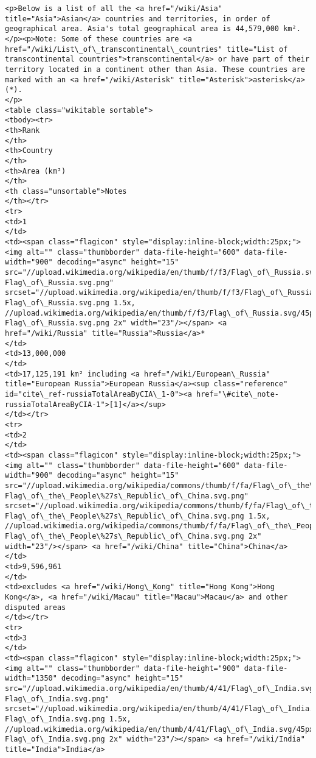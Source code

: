 \documentclass[11pt]{article}
\begin{document}
\begin{Verbatim}[commandchars=\\\{\}]
<p>Below is a list of all the <a href="/wiki/Asia" title="Asia">Asian</a> countries and territories, in order of geographical area. Asia's total geographical area is 44,579,000 km².
</p><p>Note: Some of these countries are <a href="/wiki/List\_of\_transcontinental\_countries" title="List of transcontinental countries">transcontinental</a> or have part of their territory located in a continent other than Asia. These countries are marked with an <a href="/wiki/Asterisk" title="Asterisk">asterisk</a> (*).
</p>
<table class="wikitable sortable">
<tbody><tr>
<th>Rank
</th>
<th>Country
</th>
<th>Area (km²)
</th>
<th class="unsortable">Notes
</th></tr>
<tr>
<td>1
</td>
<td><span class="flagicon" style="display:inline-block;width:25px;"><img alt="" class="thumbborder" data-file-height="600" data-file-width="900" decoding="async" height="15" src="//upload.wikimedia.org/wikipedia/en/thumb/f/f3/Flag\_of\_Russia.svg/23px-Flag\_of\_Russia.svg.png" srcset="//upload.wikimedia.org/wikipedia/en/thumb/f/f3/Flag\_of\_Russia.svg/35px-Flag\_of\_Russia.svg.png 1.5x, //upload.wikimedia.org/wikipedia/en/thumb/f/f3/Flag\_of\_Russia.svg/45px-Flag\_of\_Russia.svg.png 2x" width="23"/></span> <a href="/wiki/Russia" title="Russia">Russia</a>*
</td>
<td>13,000,000
</td>
<td>17,125,191 km² including <a href="/wiki/European\_Russia" title="European Russia">European Russia</a><sup class="reference" id="cite\_ref-russiaTotalAreaByCIA\_1-0"><a href="\#cite\_note-russiaTotalAreaByCIA-1">[1]</a></sup>
</td></tr>
<tr>
<td>2
</td>
<td><span class="flagicon" style="display:inline-block;width:25px;"><img alt="" class="thumbborder" data-file-height="600" data-file-width="900" decoding="async" height="15" src="//upload.wikimedia.org/wikipedia/commons/thumb/f/fa/Flag\_of\_the\_People\%27s\_Republic\_of\_China.svg/23px-Flag\_of\_the\_People\%27s\_Republic\_of\_China.svg.png" srcset="//upload.wikimedia.org/wikipedia/commons/thumb/f/fa/Flag\_of\_the\_People\%27s\_Republic\_of\_China.svg/35px-Flag\_of\_the\_People\%27s\_Republic\_of\_China.svg.png 1.5x, //upload.wikimedia.org/wikipedia/commons/thumb/f/fa/Flag\_of\_the\_People\%27s\_Republic\_of\_China.svg/45px-Flag\_of\_the\_People\%27s\_Republic\_of\_China.svg.png 2x" width="23"/></span> <a href="/wiki/China" title="China">China</a>
</td>
<td>9,596,961
</td>
<td>excludes <a href="/wiki/Hong\_Kong" title="Hong Kong">Hong Kong</a>, <a href="/wiki/Macau" title="Macau">Macau</a> and other disputed areas
</td></tr>
<tr>
<td>3
</td>
<td><span class="flagicon" style="display:inline-block;width:25px;"><img alt="" class="thumbborder" data-file-height="900" data-file-width="1350" decoding="async" height="15" src="//upload.wikimedia.org/wikipedia/en/thumb/4/41/Flag\_of\_India.svg/23px-Flag\_of\_India.svg.png" srcset="//upload.wikimedia.org/wikipedia/en/thumb/4/41/Flag\_of\_India.svg/35px-Flag\_of\_India.svg.png 1.5x, //upload.wikimedia.org/wikipedia/en/thumb/4/41/Flag\_of\_India.svg/45px-Flag\_of\_India.svg.png 2x" width="23"/></span> <a href="/wiki/India" title="India">India</a>

\end{Verbatim}
\end{document}
